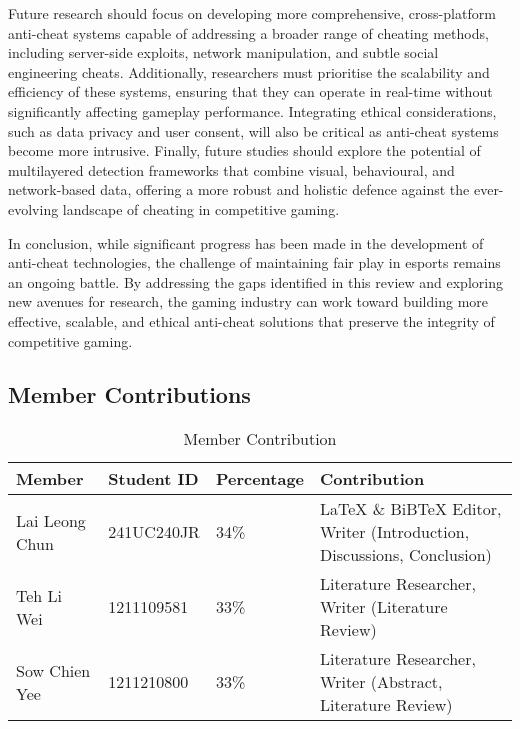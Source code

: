 \documentclass[a4paper, 12pt]{article}
\begin{document}
Future research should focus on developing more comprehensive, cross-platform anti-cheat systems capable of addressing a broader range of cheating methods, including server-side exploits, network manipulation, and subtle social engineering cheats. Additionally, researchers must prioritise the scalability and efficiency of these systems, ensuring that they can operate in real-time without significantly affecting gameplay performance. Integrating ethical considerations, such as data privacy and user consent, will also be critical as anti-cheat systems become more intrusive. Finally, future studies should explore the potential of multilayered detection frameworks that combine visual, behavioural, and network-based data, offering a more robust and holistic defence against the ever-evolving landscape of cheating in competitive gaming.

In conclusion, while significant progress has been made in the development of anti-cheat technologies, the challenge of maintaining fair play in esports remains an ongoing battle. By addressing the gaps identified in this review and exploring new avenues for research, the gaming industry can work toward building more effective, scalable, and ethical anti-cheat solutions that preserve the integrity of competitive gaming.

\newpage

{}

\begin{appendices}
\section{Member Contributions}
\begin{table}[h]
    \centering
    \begin{tabular}{l l l p{8cm}}
        \hline
        \textbf{Member} & \textbf{Student ID} & \textbf{Percentage} & \textbf{Contribution} \\
        \hline 
        Lai Leong Chun & 241UC240JR & 34\% & LaTeX \& BiBTeX Editor, Writer (Introduction, Discussions, Conclusion) \\
        Teh Li Wei & 1211109581 & 33\% & Literature Researcher, Writer (Literature Review) \\
        Sow Chien Yee & 1211210800 & 33\% & Literature Researcher, Writer (Abstract, Literature Review) \\
        \hline
    \end{tabular}
    \caption{Member Contribution}
    \label{tab:contrubution_label}
\end{table}
\end{appendices}
\end{document}
